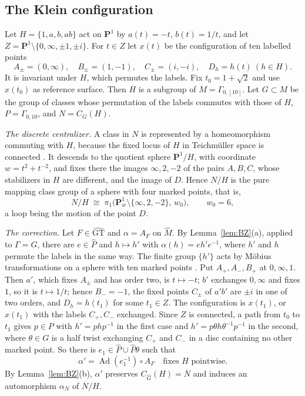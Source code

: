 \documentclass[11pt,a4paper]{article}
\theoremstyle{plain}
\theoremstyle{definition}
\theoremstyle{remark}
\newcommand{\GT}{\widehat{\mathrm{GT}}}
\newcommand{\Ad}{\operatorname{Ad}}
\begin{document}
\subsection*{The Klein configuration}
Let $H=\{1,a,b,ab\}$ act on $\mathbf P^1$ by $a(t)=-t$, $b(t)=1/t$, and let
$Z=\mathbf P^1\setminus\{0,\infty,\pm1,\pm i\}$. For $t\in Z$ let $x(t)$ be the configuration of ten labelled
points
\[
 A_\pm=(0,\infty),\quad B_\pm=(1,-1),\quad C_\pm=(i,-i),\quad D_h=h(t)\ (h\in H).
\]
It is invariant under $H$, which permutes the labels. Fix $t_0=1+\sqrt2$ and use $x(t_0)$ as reference surface.
Then $H$ is a subgroup of $M=\Gamma_{0,[10]}$. Let $G\subset M$ be the group of classes whose permutation of the
labels commutes with those of $H$, $P=\Gamma_{0,10}$, and $N=C_G(H)$.

\emph{The discrete centralizer.} A class in $N$ is represented by a homeomorphism commuting with $H$, because the
fixed locus of $H$ in Teichm\"uller space is connected \cite{K}. It descends to the quotient sphere
$\mathbf P^1/H$, with coordinate $w=t^2+t^{-2}$, and fixes there the images $\infty,2,-2$ of the pairs $A,B,C$,
whose stabilizers in $H$ are different, and the image of $D$. Hence $N/H$ is the pure mapping class group of a
sphere with four marked points, that is,
\[
 N/H\;\cong\;\pi_1\bigl(\mathbf P^1_w\setminus\{\infty,2,-2\},\,w_0\bigr),\qquad w_0=6,
\]
a loop being the motion of the point $D$.

\emph{The correction.} Let $F\in\GT$ and $\alpha=A_F$ on $\widehat M$. By Lemma~\ref{lem:BZ}(a), applied to
$\Gamma=G$, there are $e\in\widehat P$ and $h\mapsto h'$ with $\alpha(h)=eh'e^{-1}$, where $h'$ and $h$ permute
the labels in the same way. The finite group $\{h'\}$ acts by M\"obius transformations on a sphere with ten marked
points \cite{K}. Put $A_+,A_-,B_+$ at $0,\infty,1$. Then $a'$, which fixes $A_\pm$ and has order two, is $t\mapsto-t$;
$b'$ exchanges $0,\infty$ and fixes $1$, so it is $t\mapsto1/t$; hence $B_-=-1$, the fixed points $C_\pm$ of $a'b'$
are $\pm i$ in one of two orders, and $D_h=h(t_1)$ for some $t_1\in Z$. The configuration is $x(t_1)$, or $x(t_1)$
with the labels $C_+,C_-$ exchanged. Since $Z$ is connected, a path from $t_0$ to $t_1$ gives $p\in P$ with
$h'=php^{-1}$ in the first case and $h'=p\theta h\theta^{-1}p^{-1}$ in the second, where $\theta\in G$ is a half
twist exchanging $C_+$ and $C_-$ in a disc containing no other marked point. So there is
$e_1\in\widehat P\cup\widehat P\theta$ such that
\[
 \alpha'=\Ad(e_1^{-1})\circ A_F\quad\text{fixes $H$ pointwise.}
\]
By Lemma~\ref{lem:BZ}(b), $\alpha'$ preserves $C_{\widehat G}(H)=\overline N$ and induces an automorphism
$\alpha_N$ of $\overline N/H$.
\end{document}
